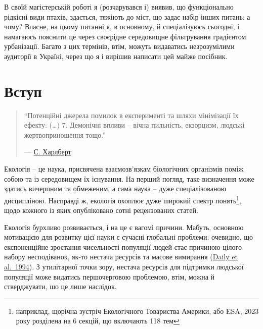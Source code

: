 \documentclass[
  11pt,
]{book}
\begin{document}
В своїй магістерській роботі я (розчарувався і) виявив, що функціонально рідкісні види птахів, здається, тяжіють до міст, що задає набір інших питань: а чому? Власне, на цьому питанні я, в основному, й спеціалізуюсь сьогодні, і намагаюсь пояснити це через своєрідне середовищне фільтрування градієнтом урбанізації. Багато з цих термінів, втім, можуть видаватись незрозумілими аудиторії в Україні, через що я і вирішив написати цей майже посібник.

\chapter{Вступ}\label{introduction}

\begin{quote}
``Потенційні джерела помилок в експерименті та шляхи мінімізації їх ефекту:
(\ldots)
7. Демонічні впливи -- вічна пильність, екзорцизм, людські жертвоприношення тощо.''

--- \href{https://doi.org/10.2307/1942661}{С. Харлберт}
\end{quote}

Екологія -- це наука, присвячена взаємозв'язкам біологічних організмів поміж собою та із середовищем їх існування. На перший погляд, таке визначення може здатись вичерпним та обмеженим, а сама наука -- дуже спеціалізованою дисципліною. Насправді ж, екологія охоплює дуже широкий спектр понять\footnote{наприклад, щорічна зустріч Екологічного Товариства Америки, або ESA, 2023 року розділена на 6 секцій, що включають 118 тем}, щодо кожного із яких опубліковано сотні рецензованих статей.

Екологія бурхливо розвивається, і на це є вагомі причини. Мабуть, основною мотивацією для розвитку цієї науки є сучасні глобальні проблеми: очевидно, що експоненційне зростання чисельності популяції людей стає причиною цілого набору несподіванок, як-то нестача ресурсів та масове вимирання (\href{https://www.jstor.org/stable/27503368}{Daily et al.~1994}). З утилітарної точки зору, нестача ресурсів для підтримки людської популяції може видатись першочерговою проблемою, втім, можна й стверджувати, шо це лише наслідок.
\end{document}
